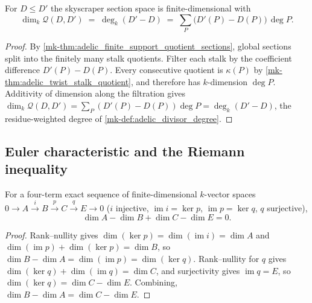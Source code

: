 \begin{proposition}
  \label{mk-thm:adelic_dim_adele_quotient_eq_degree}
  For \(D \le D'\) the skyscraper section space is finite-dimensional
  with
  \[
    \dim_k \mathcal{Q}(D, D')
      \;=\; \deg_k(D' - D)
      \;=\; \sum_P \bigl(D'(P) - D(P)\bigr)\,\deg P .
  \]
\end{proposition}
\begin{proof}
  By \ref{mk-thm:adelic_finite_support_quotient_sections}, global sections
  split into the finitely many stalk quotients.  Filter each stalk by the
  coefficient difference \(D'(P)-D(P)\).  Every consecutive quotient is
  \(\kappa(P)\) by \ref{mk-thm:adelic_twist_stalk_quotient}, and therefore has
  \(k\)-dimension \(\deg P\).  Additivity of dimension along the filtration
  gives
  \(\dim_k \mathcal{Q}(D, D') = \sum_P (D'(P) - D(P))\deg P = \deg_k(D' - D)\),
  the residue-weighted degree of \ref{mk-def:adelic_divisor_degree}.
\end{proof}

\subsection{Euler characteristic and the Riemann inequality}

\begin{lemma}
  \label{mk-lem:adelic_finrank_alternating_exact4}
  \leanok
  For a four-term exact sequence of finite-dimensional \(k\)-vector
  spaces \(0 \to A \xrightarrow{i} B \xrightarrow{p} C \xrightarrow{q} E
  \to 0\) (\(i\) injective, \(\operatorname{im} i = \ker p\),
  \(\operatorname{im} p = \ker q\), \(q\) surjective),
  \[
    \dim A - \dim B + \dim C - \dim E = 0.
  \]
\end{lemma}
\begin{proof}
  \leanok
  Rank--nullity gives \(\dim(\ker p) = \dim(\operatorname{im} i) = \dim
  A\) and \(\dim(\operatorname{im} p) + \dim(\ker p) = \dim B\), so
  \(\dim B - \dim A = \dim(\operatorname{im} p) = \dim(\ker q)\).
  Rank--nullity for \(q\) gives \(\dim(\ker q) + \dim(\operatorname{im}
  q) = \dim C\), and surjectivity gives \(\operatorname{im} q = E\), so
  \(\dim(\ker q) = \dim C - \dim E\). Combining,
  \(\dim B - \dim A = \dim C - \dim E\).
\end{proof}

